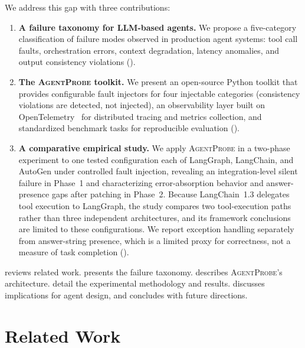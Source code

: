 \documentclass[make,article,submit,moreauthors,pdftex]{mdpi}
\providecommand{\agentprobe}{\textsc{AgentProbe}}
\newcommand{\Wrev}[1]{\texorpdfstring{{\color{RevisionOrange}#1}}{#1}}
\begin{document}
We address this gap with three contributions:

\begin{enumerate}
  \item \textbf{A failure taxonomy for LLM-based agents.} We propose a five-category classification of failure modes observed in production agent systems: tool call faults, orchestration errors, context degradation, latency anomalies, and output consistency violations ().

  \item \textbf{The \agentprobe{} toolkit.} We present an open-source Python toolkit that provides configurable fault injectors for four injectable categories (consistency violations are detected, not injected), an observability layer built on OpenTelemetry~\cite{opentelemetry2024} for distributed tracing and metrics collection, and standardized benchmark tasks for reproducible evaluation ().

  \item \textbf{A comparative empirical study.} We apply \agentprobe{} in a two-phase experiment to \Wrev{one tested configuration each of} LangGraph, LangChain, and AutoGen under controlled fault injection, revealing an integration-level silent failure in Phase~1 and characterizing error-absorption behavior and answer-presence gaps after patching in Phase~2. \Wrev{Because LangChain~1.3 delegates tool execution to LangGraph, the study compares two tool-execution paths rather than three independent architectures, and its framework conclusions are limited to these configurations. We report exception handling separately from answer-string presence, which is a limited proxy for correctness, not a measure of task completion} ().
\end{enumerate}

 reviews related work.  presents the failure taxonomy.  describes \agentprobe{}'s architecture.  detail the experimental methodology and results.  discusses implications for agent design, and  concludes with future directions.


\section{Related Work}\label{sec:related}
\end{document}
